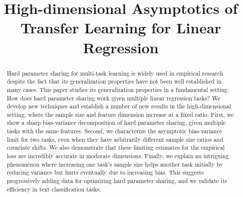 \documentclass[aos,preprint]{imsart}
\begin{document}
\begin{frontmatter}

\title{High-dimensional Asymptotics of Transfer Learning for Linear Regression} 



\begin{abstract}
	 Hard parameter sharing for multi-task learning is widely used in empirical research despite the fact that its generalization properties have not been well established in many cases. This paper studies its generalization properties in a fundamental setting: How does hard parameter sharing work given multiple linear regression tasks? We develop new techniques and establish a number of new results in the high-dimensional setting, where the sample size and feature dimension increase at a fixed ratio. First, we show a sharp bias-variance decomposition of hard parameter sharing, given multiple tasks with the same features. Second, we characterize the asymptotic bias-variance limit for two tasks, even when they have arbitrarily different sample size ratios and covariate shifts. We also demonstrate that these limiting estimates for the empirical loss are incredibly accurate in moderate dimensions. Finally, we explain an intriguing phenomenon where increasing one task's sample size helps another task initially by reducing variance but hurts eventually due to increasing bias. This suggests progressively adding data for optimizing hard parameter sharing, and we validate its efficiency in text classification tasks.
\end{abstract}


\end{frontmatter}
\end{document}
